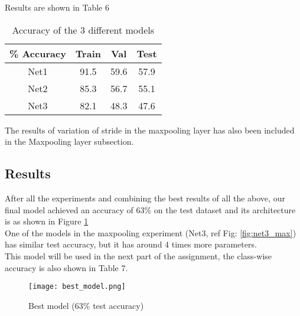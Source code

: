 \documentclass{article}
\begin{document}
\noindent
Results are shown in Table 6
\begin{table}[h!]
\begin{center}
 \begin{tabular}{||c | c c c||} 
 
 \hline
\% Accuracy  &  Train &  Val & Test\\ [0.5ex] 
 \hline\hline
  Net1 & 91.5 & 59.6 & 57.9\\
 \hline
 Net2 & 85.3 & 56.7 & 55.1\\
 \hline
 Net3 & 82.1 & 48.3 & 47.6\\
 \hline
 
\end{tabular}
\end{center}
\label{table:stride_table}
\vspace{-1.0em}
\caption{Accuracy of the 3 different models} 
\end{table}

\noindent
The results of variation of stride in the maxpooling layer has also been included in the Maxpooling layer subsection.


\subsection{Results}
After all the experiments and combining the best results of all the above, our final model achieved an accuracy of 63\% on the test dataset and its architecture is as shown in Figure \ref{fig:best_model}
\\

\noindent
One of the models in the maxpooling experiment (Net3, ref Fig: \ref{fig:net3_max}) has similar test accuracy, but it has around 4 times more parameters.
\\

\noindent
This model will be used in the next part of the assignment, the class-wise accuracy is also shown in Table 7.

\begin{figure}[H]
    \centering
    \texttt{[image: best\_model.png]}
    \vspace{-1.0em}
    \caption{Best model (63\% test accuracy)}
    \label{fig:best_model}
\end{figure}
\end{document}
